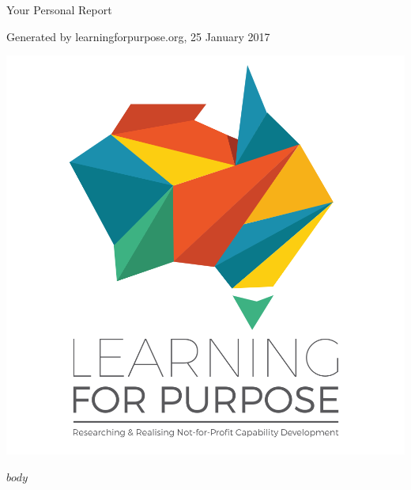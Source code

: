 \documentclass[11pt, a4paper]{article}
\begin{document}
\pagestyle{empty}

\begin{titlepage}
	\centering
	
	{%
		\fontsize{30pt}{30pt}\selectfont
		Your Personal Report
	}%
	
	\vspace*{2\baselineskip}
	{\footnotesize Generated by learningforpurpose.org, 25 January 2017}
	
	\vspace*{5\baselineskip}
	
	\includegraphics[width=.75\textwidth]{LFP_vertical_tagline.png}
	
	\vspace*{\baselineskip}
	
	\tableofcontents
\end{titlepage}

\onehalfspacing
\raggedright
$body$
\end{document}
